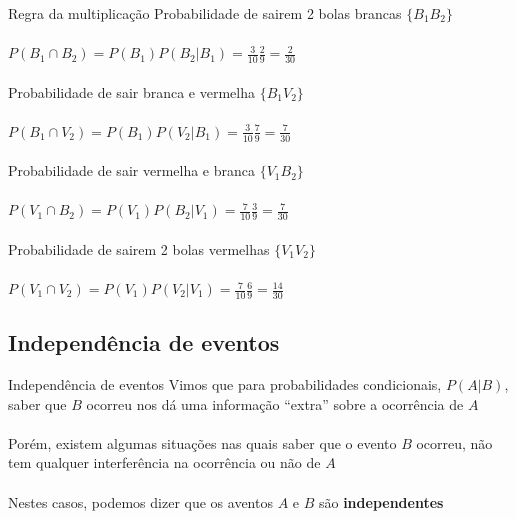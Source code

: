 \documentclass[10pt]{beamer}\usepackage[]{graphicx}\usepackage[]{color}
\theoremstyle{definition}
\begin{document}
\begin{frame}[fragile]{Regra da multiplicação} %
  Probabilidade de sairem 2 bolas brancas $\{B_1B_2\}$ \\~\\
  $P(B_1 \cap B_2) = P(B_1)P(B_2|B_1)  = \frac{3}{10} \frac{2}{9}
  = \frac{2}{30}$ \\~\\
  Probabilidade de sair branca e vermelha $\{B_1V_2\}$ \\~\\
  $P(B_1 \cap V_2) = P(B_1)P(V_2|B_1)  = \frac{3}{10} \frac{7}{9}
  = \frac{7}{30}$ \\~\\
  Probabilidade de sair vermelha e branca $\{V_1B_2\}$ \\~\\
  $P(V_1 \cap B_2) = P(V_1)P(B_2|V_1)  = \frac{7}{10} \frac{3}{9}
  = \frac{7}{30}$ \\~\\
    Probabilidade de sairem 2 bolas vermelhas $\{V_1V_2\}$ \\~\\
  $P(V_1 \cap V_2) = P(V_1)P(V_2|V_1)  = \frac{7}{10} \frac{6}{9}
  = \frac{14}{30}$
\end{frame}


\subsection{Independência de eventos}

\begin{frame}{Independência de eventos}
  Vimos que para probabilidades condicionais, $P(A|B)$, saber que $B$
  ocorreu nos dá uma informação ``extra'' sobre a ocorrência de $A$ \\~\\
  Porém, existem algumas situações nas quais saber que o evento $B$
  ocorreu, não tem qualquer interferência na ocorrência ou não de $A$\\~\\
  Nestes casos, podemos dizer que os aventos $A$ e $B$ são
  \textbf{independentes}
\end{frame}
\end{document}
